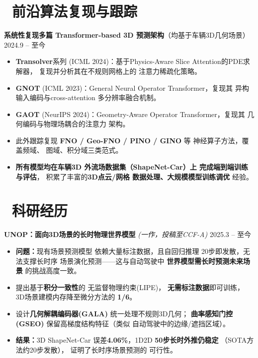 \documentclass[11pt]{article}
\begin{document}
\section{\makebox[\widthof{\faBook}][c]{\color{CVBlue}\faBook}\ 
前沿算法复现与跟踪}

\textbf{系统性复现多篇 Transformer-based 3D 
预测架构}（均基于车辆3D几何场景）
\hfill 2024.9 -- 至今
\begin{itemize}
    \item \textbf{Transolver}系列
    (ICML 2024)：基于Physics-Aware 
    Slice Attention的PDE求解器，
    复现并分析其在不规则网格上的
    注意力稀疏化策略。
    \item \textbf{GNOT}
    (ICML 2023)：General Neural 
    Operator Transformer，复现其
    异构输入编码与cross-attention
    多分辨率融合机制。
    \item \textbf{GAOT}
    (NeurIPS 2024)：Geometry-Aware 
    Operator Transformer，复现其
    几何编码与物理场耦合的注意力
    架构。
    \item 此外跟踪复现 \textbf{FNO / 
    Geo-FNO / PINO / GINO} 等
    神经算子方法，覆盖频域、
    图域、积分域三类范式。
    \item \textbf{所有模型均在车辆3D
    外流场数据集（ShapeNet-Car）上
    完成端到端训练与评估}，
    积累了丰富的\textbf{3D点云/网格
    数据处理、大规模模型训练调优}
    经验。
\end{itemize}


\section{\makebox[\widthof{\faUsers}][c]{\color{CVBlue}\faUsers}\ 
科研经历}

\textbf{UNOP：面向3D场景的长时物理世界模型} 
\textit{(一作，投稿至CCF-A)} 
\hfill 2025.3 -- 至今
\begin{itemize}
    \item \textbf{问题：}现有场景预测模型
    依赖大量标注数据，且自回归推理
    20步即发散，无法支撑长时序
    场景演化预测——这与自动驾驶中
    \textbf{世界模型需长时预测未来场景}
    的挑战高度一致。
    
    \item 提出基于\textbf{积分一致性}的
    无监督物理约束(LIPE)，
    \textbf{无需标注数据}即可训练，
    3D场景建模内存降至微分方法的
    \textbf{1/6}。
    
    \item 设计\textbf{几何解耦编码器(GALA)}
    统一处理不规则3D几何；
    \textbf{曲率感知门控(GSEO)}
    保留高梯度结构特征（类似
    自动驾驶中的边缘/遮挡区域）。
    
    \item \textbf{结果：}3D ShapeNet-Car 
    误差\textbf{4.06\%}，1D2D
    \textbf{50步长时外推仍稳定}
    （SOTA方法约20步发散），
    证明了长时序场景预测的
    可行性。
\end{itemize}
\end{document}
